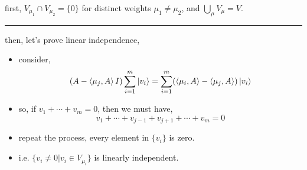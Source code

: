 \begin{itemize}
	\begin{tcolorbox}[title=proof:]
		first, $V_{\mu_1} \cap V_{\mu_2} = \{0\}$ for distinct weights $\mu_1 \neq \mu_2$, and $\bigcup_\mu V_\mu = V$.
		
		\noindent\rule[0.5ex]{\linewidth}{0.5pt} %
		
		then, let's prove linear independence,
		\begin{itemize}
			\item consider,
			\begin{equation}
				(A - \braket{\mu_j, A} I) \sum_{i = 1}^m \ket{v_i} = \sum_{i = 1}^m (\braket{\mu_i, A} - \braket{\mu_j, A}) \ket{v_i}
			\end{equation}
			
			\item so, if $v_1 + \cdots + v_m = 0$, then we must have,
			\begin{equation}
				v_1 + \cdots + v_{j - 1} + v_{j + 1} + \cdots + v_m = 0
			\end{equation}
			
			\item repeat the process, every element in $\{v_i\}$ is zero.
			
			\item i.e. $\{v_i \neq 0 | v_i \in V_{\mu_i}\}$ is linearly independent.
		\end{itemize}
	\end{tcolorbox}
\end{itemize}

